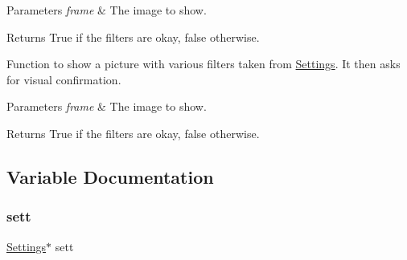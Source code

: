 \begin{DoxyParams}{Parameters}
{\em frame} & The image to show. \\
\hline
\end{DoxyParams}
\begin{DoxyReturn}{Returns}
True if the filters are okay, false otherwise.
\end{DoxyReturn}
Function to show a picture with various filters taken from \mbox{\hyperlink{class_settings}{Settings}}. It then asks for visual confirmation.


\begin{DoxyParams}{Parameters}
{\em frame} & The image to show. \\
\hline
\end{DoxyParams}
\begin{DoxyReturn}{Returns}
True if the filters are okay, false otherwise. 
\end{DoxyReturn}


\subsection{Variable Documentation}
\mbox{\label{configure_8hh_a4f37177ee03b8ce3859a16bb3d82f189}} 
\subsubsection{\texorpdfstring{sett}{sett}}
{\footnotesize\ttfamily \mbox{\hyperlink{class_settings}{Settings}}$\ast$ sett}

